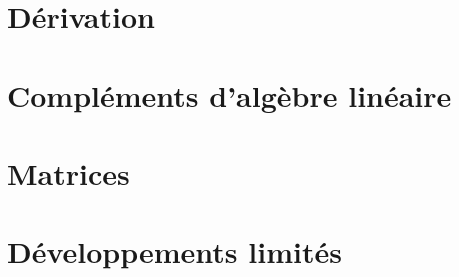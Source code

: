\documentclass[13pt, twoside, a4paper, french]{report}
\begin{document}
    \chapter{Dérivation}\label{ch:derivation}
        


    \chapter{Compléments d'algèbre linéaire}\label{ch:complements-d-algebre-lineaire}
        


    \chapter{Matrices}\label{ch:matrices}
        

    \chapter{Développements limités}\label{ch:developpements-limites}
        
\end{document}
